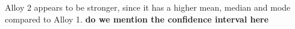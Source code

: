 \documentclass[letterpaper]{article}
\begin{document}


Alloy 2 appears to be stronger, since it has a higher mean, median and mode
compared to Alloy 1. \textbf{do we mention the confidence interval here}

\subsection{}%
%
%
\end{document}
